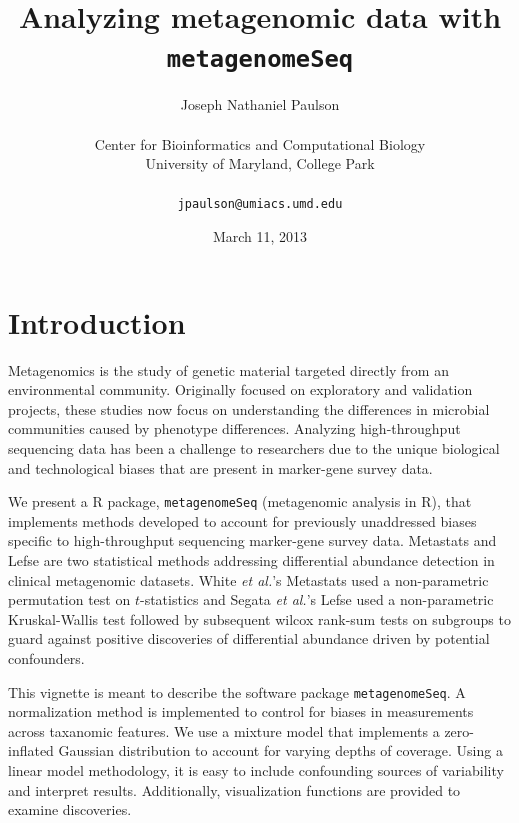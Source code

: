 \documentclass[a4paper,12pt]{article}
\begin{document}

\title{{\textbf{Analyzing metagenomic data with \texttt{metagenomeSeq}}}}
\author{Joseph Nathaniel Paulson\\[1em]\\ Center for Bioinformatics and Computational Biology\\ University of Maryland, College Park\\[1em]\\ \texttt{jpaulson@umiacs.umd.edu}}
\date{March 11, 2013}
\maketitle
\tableofcontents

\newpage


\section{Introduction}

Metagenomics is the study of genetic material targeted directly from an environmental community. 
Originally focused on exploratory and validation projects, these studies now focus on understanding the differences in microbial communities caused by phenotype differences. 
Analyzing high-throughput sequencing data has been a challenge to researchers due to the unique biological and technological biases that are present in marker-gene survey data.

 We present a R package, \texttt{metagenomeSeq} (metagenomic analysis in R), that implements methods developed to account for previously unaddressed biases specific to high-throughput sequencing marker-gene survey data.
Metastats \cite{metastats} and Lefse \cite{lefse} 
 are two statistical methods addressing differential abundance detection in clinical metagenomic datasets. 
 White \textit{et al.}'s Metastats used a non-parametric permutation test on $t$-statistics and Segata \textit{et al.}'s Lefse used a non-parametric Kruskal-Wallis test followed by subsequent wilcox rank-sum tests on subgroups to guard against positive discoveries of differential abundance driven by potential confounders.

This vignette is meant to describe the software package \texttt{metagenomeSeq}. 
A normalization method is implemented to control for biases in measurements across taxanomic features. 
We use a mixture model that implements a zero-inflated Gaussian distribution to account for varying depths of coverage. 
Using a linear model methodology, it is easy to include confounding sources of variability and interpret results. 
Additionally, visualization functions are provided to examine discoveries. 
\end{document}
